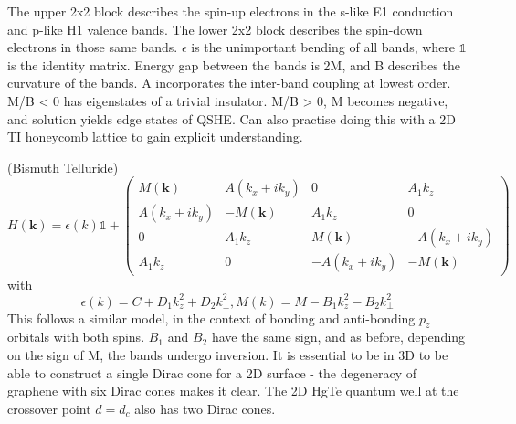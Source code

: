 \documentclass[../mattg_ti-fi_lit-review.tex]{subfiles}
\begin{document}
\begin{outline}
		\4 The upper 2x2 block describes the spin-up electrons in the s-like E1 conduction and p-like H1 valence bands.
		The lower 2x2 block describes the spin-down electrons in those same bands.
		\4 $\epsilon$ is the unimportant bending of all bands, where $\mathds{1}$ is the identity matrix.
		\4 Energy gap between the bands is 2M, and B describes the curvature of the bands. 
		\4 A incorporates the inter-band coupling at lowest order.
		\4 M/B < 0 has eigenstates of a trivial insulator.
		\4 M/B > 0, M becomes negative, and solution yields edge states of QSHE.
		\4 Can also practise doing this with a 2D TI honeycomb lattice to gain explicit understanding. \cite{kane_quantum_2005,kane_z_2005}
		
		\3 \bismuthtelluride{} (Bismuth Telluride) 
		\begin{equation}
		H(\textbf{k}) = \epsilon(k)\mathds{1} + \left(
		\begin{matrix}
		M(\textbf{k}) & A(k_x+ik_y) & 0 & A_1k_z\\
		A(k_x+ik_y) & -M(\textbf{k}) & A_1k_z & 0\\
		0 & A_1k_z & M(\textbf{k}) & -A(k_x+ik_y)\\
		A_1k_z & 0 & -A(k_x+ik_y) & -M(\textbf{k})
		\end{matrix}
		\right)
		\end{equation}
		with \begin{equation}
		\epsilon(k)=C+D_1k_z^2 + D_2k_\perp^2, M(k) = M - B_1k_z^2 - B_2k_\perp^2
		\end{equation}
		\4 This follows a similar model, in the context of bonding and anti-bonding $p_z$ orbitals with both spins. $B_1$ and $B_2$ have the same sign, and as before, depending on the sign of M, the bands undergo inversion.
		\2 It is essential to be in 3D to be able to construct a single Dirac cone for a 2D surface - the degeneracy of graphene with six Dirac cones makes it clear. The 2D HgTe quantum well at the crossover point $d=d_c$ also has two Dirac cones.  
	\end{outline}
	
\end{document}
